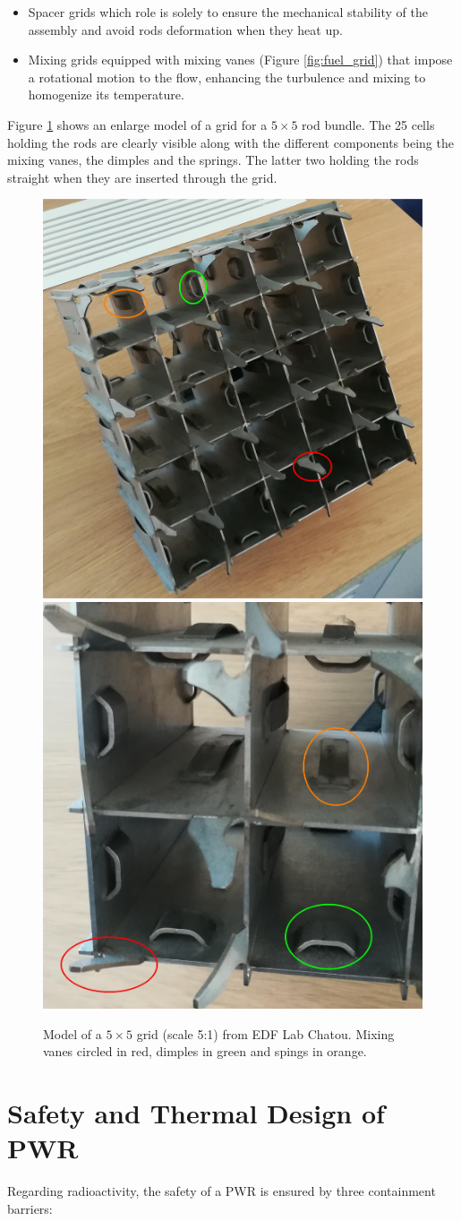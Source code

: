 \begin{itemize}
\item Spacer grids which role is solely to ensure the mechanical stability of the assembly and avoid rods deformation when they heat up.
\item Mixing grids equipped with mixing vanes (Figure \ref{fig:fuel_grid}) that impose a rotational motion to the flow, enhancing the turbulence and mixing to homogenize its temperature.
\end{itemize}

Figure \ref{fig:fuel_grid_I8C} shows an enlarge model of a grid for a $5 \times 5$ rod bundle. The 25 cells holding the rods are clearly visible along with the different components being the mixing vanes, the dimples and the springs. The latter two holding the rods straight when they are inserted through the grid.


\begin{figure}[!h]
\centering
\includegraphics[width=0.3\linewidth]{img/intro/MaquetteGrille.png}
\includegraphics[width=0.3\linewidth]{img/intro/CanauxGrille.jpg}
\caption{Model of a $5 \times 5$ grid (scale 5:1) from EDF Lab Chatou. Mixing vanes circled in red, dimples in green and spings in orange.}
\label{fig:fuel_grid_I8C}
\end{figure}

\npar

\section{Safety and Thermal Design of PWR}

Regarding radioactivity, the safety of a PWR is ensured by three containment barriers:

